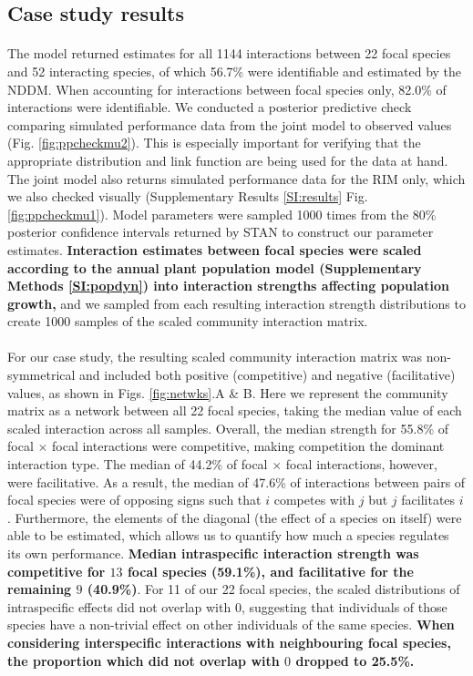 \documentclass[a4,12pt]{article}
\begin{document}
\begin{refsection}
    \subsection{Case study results}

    \paragraph{}
    The model returned estimates for all 1144 interactions between 22 focal species and 52 interacting species, of which 56.7\% were identifiable and estimated by the NDDM. When accounting for interactions between focal species only, 82.0\% of interactions were identifiable. We conducted a posterior predictive check comparing simulated performance data from the joint model to observed values (Fig. \ref{fig:ppcheckmu2}). This is especially important for verifying that the appropriate distribution and link function are being used for the data at hand. The joint model also returns simulated performance data for the RIM only, which we also checked visually (Supplementary Results \ref{SI:results} Fig. \ref{fig:ppcheckmu1}). Model parameters were sampled 1000 times from the 80\% posterior confidence intervals returned by STAN to construct our parameter estimates. \textbf{Interaction estimates between focal species were scaled according to the annual plant population model (Supplementary Methods \ref{SI:popdyn}) into interaction strengths affecting population growth,} and we sampled from each resulting interaction strength distributions to create 1000 samples of the scaled community interaction matrix.

    \paragraph{}
    For our case study, the resulting scaled community interaction matrix was non-symmetrical and included both positive (competitive) and negative (facilitative) values, as shown in Figs. \ref{fig:netwks}.A \& B. Here we represent the community matrix as a network between all 22 focal species, taking the median value of each scaled interaction across all samples. Overall, the median strength for 55.8\% of focal $\times$ focal interactions were competitive, making competition the dominant interaction type. The median of 44.2\% of focal $\times$ focal interactions, however, were facilitative. As a result, the median of 47.6\% of interactions between pairs of focal species were of opposing signs such that $i$ competes with $j$ but $j$ facilitates $i$. Furthermore, the elements of the diagonal (the effect of a species on itself) were able to be estimated, which allows us to quantify how much a species regulates its own performance. \textbf{Median intraspecific interaction strength was competitive for $13$ focal species (59.1\%), and facilitative for the remaining $9$ (40.9\%)}. For 11 of our 22 focal species, the scaled distributions of intraspecific effects did not overlap with $0$, suggesting that individuals of those species have a non-trivial effect on other individuals of the same species. \textbf{When considering interspecific interactions with neighbouring focal species, the proportion which did not overlap with $0$ dropped to 25.5\%.}


\end{refsection}
\end{document}
